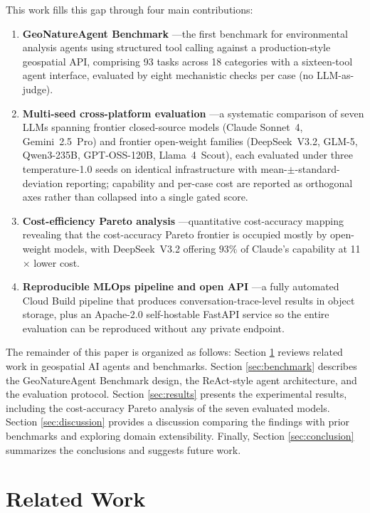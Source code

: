 \documentclass[sigconf]{acmart}
\begin{document}
This work fills this gap through four main contributions:
\begin{enumerate}
    \item \textbf{GeoNatureAgent Benchmark} ---the first benchmark for environmental analysis agents using structured tool calling against a production-style geospatial API, comprising 93 tasks across 18 categories with a sixteen-tool agent interface, evaluated by eight mechanistic checks per case (no LLM-as-judge).
    \item \textbf{Multi-seed cross-platform evaluation} ---a systematic comparison of seven LLMs spanning frontier closed-source models (Claude Sonnet~4, Gemini~2.5~Pro) and frontier open-weight families (DeepSeek~V3.2, GLM-5, Qwen3-235B, GPT-OSS-120B, Llama~4~Scout), each evaluated under three tempe\-rature-1.0 seeds on identical infrastructure with mean-$\pm$-standard-deviation reporting; capability and per-case cost are reported as orthogonal axes rather than collapsed into a single gated score.
    \item \textbf{Cost-efficiency Pareto analysis} ---quantitative cost-accuracy mapping revealing that the cost-accuracy Pareto frontier is occupied mostly by open-weight models, with DeepSeek~V3.2 offering $93\%$ of Claude's capability at 11$\times$ lower cost.
    \item \textbf{Reproducible MLOps pipeline and open API} ---a fully automated Cloud Build pipeline that produces conversation-trace-level results in object storage, plus an Apache-2.0 self-hostable FastAPI service so the entire evaluation can be reproduced without any private endpoint.
\end{enumerate}

The remainder of this paper is organized as follows: Section \ref{sec:related} reviews related work in geospatial AI agents and benchmarks. Section \ref{sec:benchmark} describes the GeoNatureAgent Benchmark design, the ReAct-style agent architecture, and the evaluation protocol. Section \ref{sec:results} presents the experimental results, including the cost-accuracy Pareto analysis of the seven evaluated models. Section \ref{sec:discussion} provides a discussion comparing the findings with prior benchmarks and exploring domain extensibility. Finally, Section \ref{sec:conclusion} summarizes the conclusions and suggests future work.



\section{Related Work}
\label{sec:related}
\end{document}
